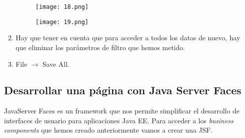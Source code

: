 \begin{enumerate}
	\begin{figure}[!h]
	  \centering
	    \texttt{[image: 18.png]}
	\end{figure}
	\pagebreak
	\begin{figure}[!h]
	  \centering
	    \texttt{[image: 19.png]}
	\end{figure}
	\item Hay que tener en cuenta que para acceder a todos los datos de nuevo, hay que eliminar los parámetros de filtro que hemos metido.
	\item File $\rightarrow$ Save All.
\end{enumerate}

\subsection{Desarrollar una página con Java Server Faces}
JavaServer Faces es un framework que nos permite simplificar el desarrollo de interfaces de usuario para aplicaciones Java EE. Para acceder a los \textit{business components} que hemos creado anteriormente vamos a crear una JSF.

